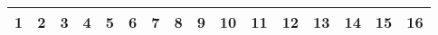 \documentclass[36pt]{scrartcl}
\begin{document}
\begin{table}
\begin{tabular}
\end{tabular}

\begin{tabular}{|c|c|c|c|c|c!{\vrule width 2pt}c|c|c|c|c|c|c|c|c|c|}
\hline
\bfseries \large 1 & \bfseries \large 2 & \bfseries \large 3 & \bfseries \large 4 & \bfseries \large 5 & \bfseries \large 6 & \bfseries \large 7 & \bfseries \large 8 & \bfseries \large 9 & \bfseries \large 10 & \bfseries \large 11 & \bfseries \large 12 & \bfseries \large 13 & \bfseries \large 14 & \bfseries \large 15 & \bfseries \large 16 \\
\hline
\end{tabular}


\begin{tabular}{|p{15cm}!{\vrule width 3pt}p{2cm}!{\vrule width 3pt}}
\hline
 & \\
\hline
\end{tabular}

\end{table}
\end{document}
